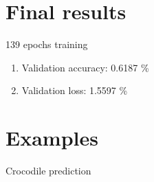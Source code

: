 \documentclass{beamer}
\begin{document}
\section{Final results}

\begin{frame}[fragile]{139 epochs training}
 \begin{enumerate}
  \item Validation accuracy: 0.6187 \%
  \item Validation loss: 1.5597 \%
 \end{enumerate}
\end{frame}

\section{Examples}

\begin{frame}[fragile]{Crocodile prediction}
\end{frame}
\end{document}
